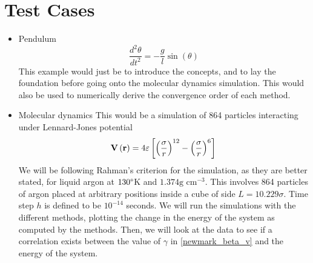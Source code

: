 \documentclass[a4paper, 12pt]{article}
\renewcommand{\vec}[1]{\mathbf{#1}}
\begin{document}
	\section{Test Cases}
\begin{itemize}
	\item Pendulum
$$
\frac{d^2\theta}{dt^2} = -\frac{g}{l}\sin(\theta)
$$
This example would just be to introduce the concepts, and to lay the foundation before going onto the molecular dynamics simulation. This would also be used to numerically derive the convergence order of each method.
	\item Molecular dynamics
This would be a simulation of 864 particles interacting under Lennard-Jones potential
$$
\vec{V}\left(\vec{r}\right) = 4\varepsilon \left[ \left( \frac{\sigma}{r}\right)^{12} - \left( \frac{\sigma}{r}\right)^6 \right] \\
$$
We will be following Rahman's \cite{Rahman1964} criterion for the simulation, as they are better stated, for liquid argon at $130\degree $K  and $1.374 \mbox{g cm}^{-3}$.  This involves 864 particles of argon placed at arbitrary positions inside a cube of side $ L = 10.229\sigma$. Time step $h$ is defined to be $10^{-14}$ seconds. We will run the simulations with the different methods, plotting the change in the energy of the system as computed by the methods. Then, we will look at the data to see if a correlation exists between the value of $\gamma$ in \eqref{newmark_beta_v} and the energy of the system.
\end{itemize}
\end{document}
